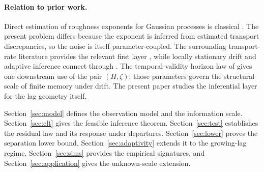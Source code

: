 \paragraph{Relation to prior work.}
Direct estimation of roughness exponents for Gaussian processes is classical
\citep{istas1997quadratic,coeurjolly2001estimating}. The present problem differs
because the exponent is inferred from estimated transport discrepancies, so the
noise is itself parameter-coupled. The surrounding transport-rate literature
provides the relevant first layer \citep{fournier2015rate,weed2019sharp,
goldfeld2024limit,delbarrio2023improved}, while locally stationary drift and
adaptive inference connect through \citep{dahlhaus1997fitting,
vogt2012nonparametric,tinio2025bounds,brutsche2024similarity}.
The temporal-validity horizon law of \citet{Parreira2026May} gives one
downstream use of the pair $(H,\zeta)$: those parameters govern the structural
scale of finite memory under drift. The present paper studies the inferential
layer for the lag geometry itself.

Section~\ref{sec:model} defines the observation model and the information
scale. Section~\ref{sec:clt} gives the feasible inference theorem.
Section~\ref{sec:test} establishes the residual law and its response
under departures. Section~\ref{sec:lower} proves the separation lower bound,
Section~\ref{sec:adaptivity} extends it to the growing-lag regime,
Section~\ref{sec:sims} provides the empirical signatures, and
Section~\ref{sec:application} gives the unknown-scale extension.
